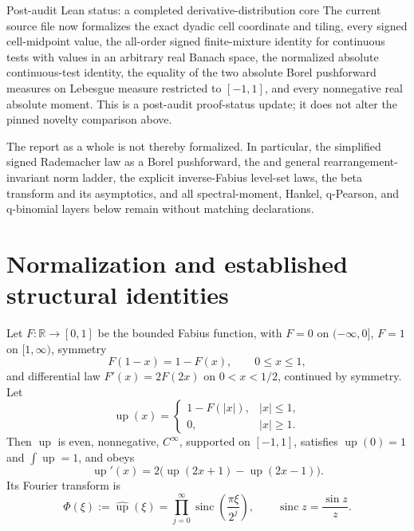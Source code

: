 \documentclass[11pt,oneside]{article}
\theoremstyle{definition}
\theoremstyle{remark}
\newcommand{\R}{\mathbb R}
\newcommand{\Up}{\operatorname{up}}
\newcommand{\sinc}{\operatorname{sinc}}
\begin{document}
\begin{statusbox}{Post-audit Lean status: a completed derivative-distribution core}
The current source file
now formalizes the exact dyadic cell coordinate and tiling, every signed cell-midpoint value,
the all-order signed finite-mixture identity for continuous tests with values in an arbitrary
real Banach space, the normalized absolute continuous-test identity, the equality of the two
absolute Borel pushforward measures on Lebesgue measure restricted to \([-1,1]\), and every
nonnegative real absolute moment.  This is a post-audit proof-status update; it does not alter
the pinned novelty comparison above.

The report as a whole is not thereby formalized.  In particular, the simplified signed
Rademacher law as a Borel pushforward, the  and general
rearrangement-invariant norm ladder, the explicit inverse-Fabius level-set laws, the beta
transform and its asymptotics, and all spectral-moment, Hankel, q-Pearson, and
q-binomial layers below remain without matching declarations.
\end{statusbox}

\section{Normalization and established structural identities}
\label{p4:sec:baseline}

Let $F:\R\to[0,1]$ be the bounded Fabius function, with $F=0$ on $(-\infty,0]$,
$F=1$ on $[1,\infty)$, symmetry
\begin{equation}
 F(1-x)=1-F(x),\qquad 0\leq x\leq1,
 \label{p4:eq:F-symmetry}
\end{equation}
and differential law $F'(x)=2F(2x)$ on $0<x<1/2$, continued by symmetry.  Let
\begin{equation}
 \Up(x)=
 \begin{cases}
  1-F(|x|),&|x|\leq1,\\
  0,&|x|\geq1.
 \end{cases}
 \label{p4:eq:up-from-F}
\end{equation}
Then $\Up$ is even, nonnegative, $C^\infty$, supported on $[-1,1]$, satisfies
$\Up(0)=1$ and $\int\Up=1$, and obeys
\begin{equation}
 \Up'(x)=2\bigl(\Up(2x+1)-\Up(2x-1)\bigr).
 \label{p4:eq:up-differential}
\end{equation}
Its Fourier transform is
\begin{equation}
 \Phi(\xi):=\widehat{\Up}(\xi)
 =\prod_{j=0}^{\infty}\sinc\!\left(\frac{\pi\xi}{2^j}\right),
 \qquad \sinc z=\frac{\sin z}{z}.
 \label{p4:eq:phi-product}
\end{equation}
\end{document}
